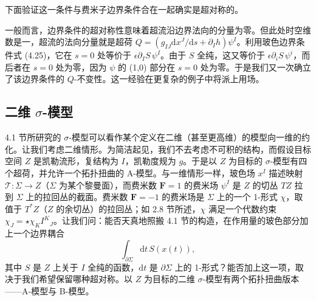 \documentclass[11pt,a4paper,UTF8]{ctexart}
\theoremstyle{plain}
\theoremstyle{definition}
\newcommand{\sigmatxt}{$\sigma$}
\begin{document}
下面验证这一条件与费米子边界条件合在一起确实是超对称的。

一般而言，边界条件的超对称性意味着超流沿边界法向的分量为零。但此处时空维数是一，超流的法向分量就是超荷 $Q=(g_{IJ}\mathrm{d}x^J/\mathrm{d}s+\partial_I h)\psi^I$。利用玻色边界条件式 (4.25)，它在 $s=0$ 处等价于 $\epsilon\partial_I S\,\psi^I$。由于 $S$ 全纯，这又等价于 $\epsilon\partial_i S\,\psi^i$，而后者在 $s=0$ 处为零，因为 $\psi$ 的 (1,0) 部分在 $s=0$ 处为零。于是我们又一次确立了该边界条件的 $Q$-不变性。这一经验在更复杂的例子中将派上用场。


\subsection{二维 \sigmatxt-模型}

4.1 节所研究的 $\sigma$-模型可以看作某个定义在二维（甚至更高维）的模型向一维的约化。让我们考虑二维情形。为简洁起见，我们不去考虑不可积的结构，而假设目标空间 $Z$ 是凯勒流形，复结构为 $I$，凯勒度规为 $g$。于是以 $Z$ 为目标的 $\sigma$-模型有四个超荷，并允许一个拓扑扭曲的 A-模型。与一维情形一样，玻色场 $x^I$ 描述映射 $\mathcal{T}:\Sigma\to Z$（$\Sigma$ 为某个黎曼面），而费米数 $\boldsymbol{F}=1$ 的费米场 $\psi^I$ 是 $Z$ 的切丛 $TZ$ 拉到 $\Sigma$ 上的拉回丛的截面。费米数 $\boldsymbol{F}=-1$ 的费米场是 $\Sigma$ 上的一个 1-形式 $\chi$，取值于 $T^*Z$（$Z$ 的余切丛）的拉回丛；如 2.8 节所述，$\chi$ 满足一个代数约束 $\chi_J=\star\chi_K I^K{}_J$。让我们问：能否天真地照搬 4.1 节的构造，在作用量的玻色部分加上一个边界耦合
\begin{equation}
    \int_{\partial\Sigma}\mathrm{d}t\,S(x(t)),
    \tag{4.26}
\end{equation}
其中 $S$ 是 $Z$ 上关于 $I$ 全纯的函数，$\mathrm{d}t$ 是 $\partial\Sigma$ 上的 1-形式？能否加上这一项，取决于我们希望保留哪种超对称。以 $Z$ 为目标的二维 $\sigma$-模型有两个拓扑扭曲版本——A-模型与 B-模型。

\end{document}
